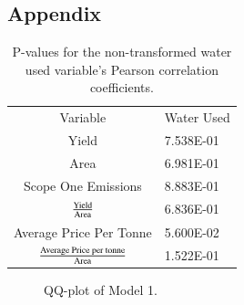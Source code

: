 \documentclass[review,12pt,authoryear]{elsarticle}
\begin{document}
\begin{linenumbers}



 \appendix

\section{Appendix}
\par

\begin{table}[]
      \caption{P-values for the non-transformed water used variable's Pearson correlation coefficients.}
      \begin{tabular}{cl}
      Variable                                           & Water Used \\
      Yield                                              & 7.538E-01  \\
      Area                                               & 6.981E-01  \\
      Scope One Emissions                                & 8.883E-01  \\
      $\textrm{Yield}\over\textrm{Area}$                     & 6.836E-01  \\
      Average Price Per Tonne                            & 5.600E-02  \\
      ${\textrm{Average Price per tonne}\over\textrm{Area}}$ & 1.522E-01 
      \end{tabular}
\end{table}


\begin{figure}
  \caption{QQ-plot of Model 1.}
\end{figure}


\end{linenumbers}
\end{document}

